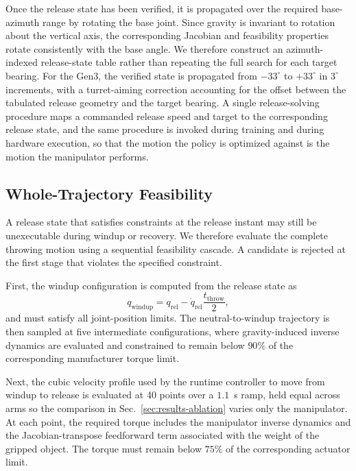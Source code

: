\documentclass[letterpaper, 10 pt, conference]{ieeeconf}
\begin{document}
Once the release state has been verified, it is propagated over the required
base-azimuth range by rotating the base joint. Since gravity is invariant to
rotation about the vertical axis, the corresponding Jacobian and feasibility
properties rotate consistently with the base angle. We therefore construct an
azimuth-indexed release-state table rather than repeating the full search for
each target bearing. For the Gen3, the verified state is propagated from
$-33^\circ$ to $+33^\circ$ in $3^\circ$ increments, with a turret-aiming
correction accounting for the offset between the tabulated release geometry and
the target bearing. A single release-solving procedure maps a commanded release
speed and target to the corresponding release state, and the same procedure is
invoked during training and during hardware execution, so that the motion the
policy is optimized against is the motion the manipulator performs.

\subsection{Whole-Trajectory Feasibility}
\label{sec:method-feasibility}

A release state that satisfies constraints at the release instant may still be
unexecutable during windup or recovery. We therefore evaluate the complete
throwing motion using a sequential feasibility cascade. A candidate is rejected
at the first stage that violates the specified constraint.

First, the windup configuration is computed from the release state as
\begin{equation}
q_{\mathrm{windup}}
=
q_{\mathrm{rel}}
-
\dot q_{\mathrm{rel}}\frac{t_{\mathrm{throw}}}{2},
\end{equation}
and must satisfy all joint-position limits. The neutral-to-windup trajectory
is then sampled at five intermediate configurations, where gravity-induced
inverse dynamics are evaluated and constrained to remain below $90\%$ of the
corresponding manufacturer torque limit.

Next, the cubic velocity profile used by the runtime controller to move from
windup to release is evaluated at 40 points over a $1.1$~s ramp, held equal
across arms so the comparison in Sec.~\ref{sec:results-ablation} varies only the
manipulator. At each point, the required torque
includes the manipulator inverse dynamics and the Jacobian-transpose
feedforward term associated with the weight of the gripped object. The torque
must remain below $75\%$ of the corresponding actuator limit.
\end{document}
